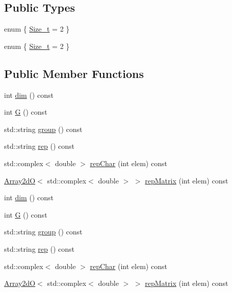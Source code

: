 \subsection*{Public Types}
\begin{DoxyCompactItemize}
\item 
enum \{ \mbox{\hyperlink{structHadron_1_1C4nnmERep_a0a82b3aa16f1c6079c6bcfcf088891f7acad081a8a6c1ab83493a6d3b86d67f7e}{Size\+\_\+t}} = 2
 \}
\item 
enum \{ \mbox{\hyperlink{structHadron_1_1C4nnmERep_a0a82b3aa16f1c6079c6bcfcf088891f7acad081a8a6c1ab83493a6d3b86d67f7e}{Size\+\_\+t}} = 2
 \}
\end{DoxyCompactItemize}
\subsection*{Public Member Functions}
\begin{DoxyCompactItemize}
\item 
int \mbox{\hyperlink{structHadron_1_1C4nnmERep_ae5381e6e188b515505fbd5d6a7c6e7c9}{dim}} () const
\item 
int \mbox{\hyperlink{structHadron_1_1C4nnmERep_aeebb3eed0a37633aded692d6d5929f84}{G}} () const
\item 
std\+::string \mbox{\hyperlink{structHadron_1_1C4nnmERep_a45a936a694de501cfdb433b97302755a}{group}} () const
\item 
std\+::string \mbox{\hyperlink{structHadron_1_1C4nnmERep_af7b1046412f5b815c19810b47eb8686d}{rep}} () const
\item 
std\+::complex$<$ double $>$ \mbox{\hyperlink{structHadron_1_1C4nnmERep_af3cb7f743630f5a14e38a10ee61dc9ff}{rep\+Char}} (int elem) const
\item 
\mbox{\hyperlink{classADAT_1_1Array2dO}{Array2dO}}$<$ std\+::complex$<$ double $>$ $>$ \mbox{\hyperlink{structHadron_1_1C4nnmERep_adb5804895fb825dd5a5fde9c417e5cb8}{rep\+Matrix}} (int elem) const
\item 
int \mbox{\hyperlink{structHadron_1_1C4nnmERep_ae5381e6e188b515505fbd5d6a7c6e7c9}{dim}} () const
\item 
int \mbox{\hyperlink{structHadron_1_1C4nnmERep_aeebb3eed0a37633aded692d6d5929f84}{G}} () const
\item 
std\+::string \mbox{\hyperlink{structHadron_1_1C4nnmERep_a45a936a694de501cfdb433b97302755a}{group}} () const
\item 
std\+::string \mbox{\hyperlink{structHadron_1_1C4nnmERep_af7b1046412f5b815c19810b47eb8686d}{rep}} () const
\item 
std\+::complex$<$ double $>$ \mbox{\hyperlink{structHadron_1_1C4nnmERep_af3cb7f743630f5a14e38a10ee61dc9ff}{rep\+Char}} (int elem) const
\item 
\mbox{\hyperlink{classADAT_1_1Array2dO}{Array2dO}}$<$ std\+::complex$<$ double $>$ $>$ \mbox{\hyperlink{structHadron_1_1C4nnmERep_adb5804895fb825dd5a5fde9c417e5cb8}{rep\+Matrix}} (int elem) const
\end{DoxyCompactItemize}


